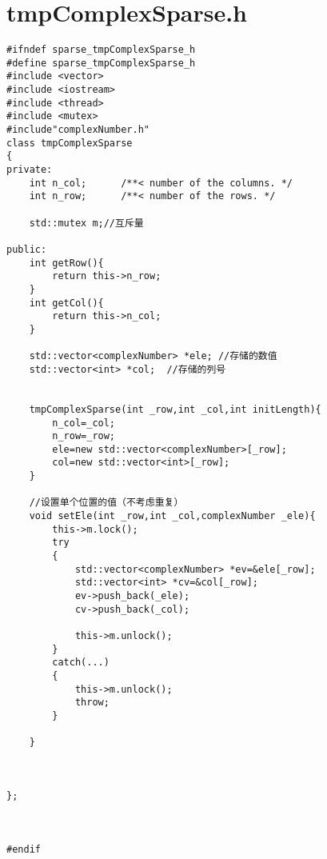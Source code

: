 \section{tmpComplexSparse.h}
\begin{lstlisting}
#ifndef sparse_tmpComplexSparse_h
#define sparse_tmpComplexSparse_h
#include <vector>
#include <iostream>
#include <thread>
#include <mutex>
#include"complexNumber.h"
class tmpComplexSparse
{
private:
    int n_col;		/**< number of the columns. */
    int n_row;		/**< number of the rows. */
    
    std::mutex m;//互斥量
    
public:
    int getRow(){
        return this->n_row;
    }
    int getCol(){
        return this->n_col;
    }
    
    std::vector<complexNumber> *ele; //存储的数值
    std::vector<int> *col;	//存储的列号
    
    
    tmpComplexSparse(int _row,int _col,int initLength){
        n_col=_col;
        n_row=_row;
        ele=new std::vector<complexNumber>[_row];
        col=new std::vector<int>[_row];
    }
    
    //设置单个位置的值（不考虑重复）
    void setEle(int _row,int _col,complexNumber _ele){
        this->m.lock();
        try
        {
            std::vector<complexNumber> *ev=&ele[_row];
            std::vector<int> *cv=&col[_row];
            ev->push_back(_ele);
            cv->push_back(_col);
            
            this->m.unlock();
        }
        catch(...)
        {
            this->m.unlock();
            throw;
        }
        
    }
    
    
    
};



#endif

\end{lstlisting}

